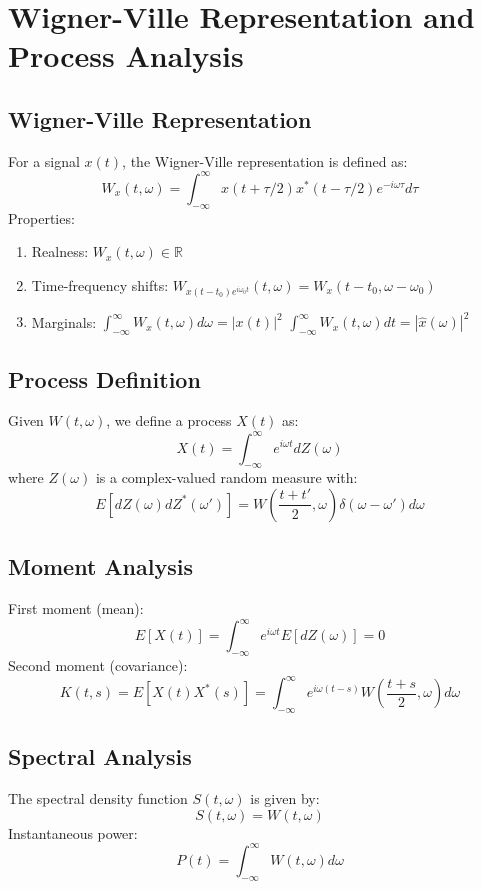 \documentclass{article}
\begin{document}
\section{Wigner-Ville Representation and Process Analysis}
\subsection{Wigner-Ville Representation}
For a signal $x(t)$, the Wigner-Ville representation is defined as:
\begin{equation}
W_x(t,\omega) = \int_{-\infty}^{\infty} x(t + \tau/2) x^*(t - \tau/2) e^{-i\omega\tau} d\tau
\end{equation}
Properties:
\begin{enumerate}
\item Realness: $W_x(t,\omega) \in \mathbb{R}$
\item Time-frequency shifts: $W_{x(t-t_0)e^{i\omega_0 t}}(t,\omega) = W_x(t-t_0,\omega-\omega_0)$
\item Marginals:
$\int_{-\infty}^{\infty} W_x(t,\omega) d\omega = |x(t)|^2$
$\int_{-\infty}^{\infty} W_x(t,\omega) dt = |\hat{x}(\omega)|^2$
\end{enumerate}
\subsection{Process Definition}
Given $W(t,\omega)$, we define a process $X(t)$ as:
\begin{equation}
X(t) = \int_{-\infty}^{\infty} e^{i\omega t} dZ(\omega)
\end{equation}
where $Z(\omega)$ is a complex-valued random measure with:
\begin{equation}
E[dZ(\omega)dZ^*(\omega')] = W(\frac{t+t'}{2},\omega) \delta(\omega-\omega')d\omega
\end{equation}
\subsection{Moment Analysis}
First moment (mean):
\begin{equation}
E[X(t)] = \int_{-\infty}^{\infty} e^{i\omega t} E[dZ(\omega)] = 0
\end{equation}
Second moment (covariance):
\begin{equation}
K(t,s) = E[X(t)X^*(s)] = \int_{-\infty}^{\infty} e^{i\omega(t-s)} W(\frac{t+s}{2},\omega) d\omega
\end{equation}
\subsection{Spectral Analysis}
The spectral density function $S(t,\omega)$ is given by:
\begin{equation}
S(t,\omega) = W(t,\omega)
\end{equation}
Instantaneous power:
\begin{equation}
P(t) = \int_{-\infty}^{\infty} W(t,\omega) d\omega
\end{equation}
\end{document}
